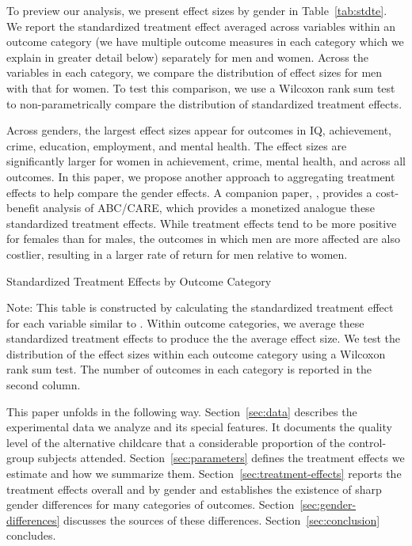 To preview our analysis, we present effect sizes by gender in Table~\ref{tab:stdte}. We report the standardized treatment effect averaged across variables within an outcome category (we have multiple outcome measures in each category which we explain in greater detail below) separately for men and women. Across the variables in each category, we compare the distribution of effect sizes for men with that for women. To test this comparison, we use a Wilcoxon rank sum test to non-parametrically compare the distribution of standardized treatment effects.

Across genders, the largest effect sizes appear for outcomes in IQ, achievement, crime, education, employment, and mental health. The effect sizes are significantly larger for women in achievement, crime, mental health, and across all outcomes. In this paper, we propose another approach to aggregating treatment effects to help compare the gender effects. A companion paper, \citet{Garcia_Heckman_Leaf_etal_2017_Comp_CBA_Unpublished}, provides a cost-benefit analysis of ABC/CARE, which provides a monetized analogue these standardized treatment effects. While treatment effects tend to be more positive for females than for males, the outcomes in which men are more affected are also costlier, resulting in a larger rate of return for men relative to women. 

\begin{table}[H]
\centering
\caption{Standardized Treatment Effects by Outcome Category}
\label{tab:stdte}
\begin{threeparttable}

\begin{tablenotes}
\footnotesize
\item Note: This table is constructed by calculating the standardized treatment effect for each variable similar to \citet{Katz_Kling_etal_2001_QJE,Finkelstein_etal_2012_Oregon_QJE}. Within outcome categories, we average these standardized treatment effects to produce the the average effect size. We test the distribution of the effect sizes within each outcome category using a Wilcoxon rank sum test. The number of outcomes in each category is reported in the second column. 
\end{tablenotes}
\end{threeparttable}
\end{table}


This paper unfolds in the following way. Section~\ref{sec:data} describes the experimental data we analyze and its special features. It documents the quality level of the alternative childcare that a considerable proportion of the control-group subjects attended. Section~\ref{sec:parameters} defines the treatment effects we estimate and how we summarize them. Section~\ref{sec:treatment-effects} reports the treatment effects overall and by gender and establishes the existence of sharp gender differences for many categories of outcomes. Section~\ref{sec:gender-differences} discusses the sources of these differences. Section~\ref{sec:conclusion} concludes.


